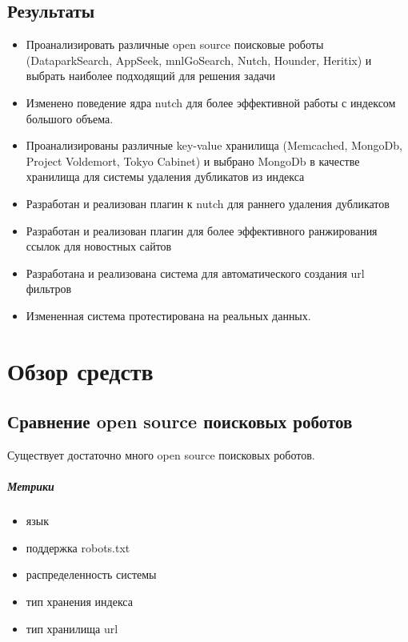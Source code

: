 \section{Результаты}
\begin{itemize}
 \item Проанализировать различные open source поисковые роботы (DataparkSearch,
AppSeek, mnlGoSearch, Nutch, Hounder, Heritix) и выбрать наиболее подходящий для
решения задачи
 \item Изменено поведение ядра nutch для более эффективной работы с индексом большого объема.
 \item Проанализированы различные key-value хранилища (Memcached, MongoDb, Project Voldemort, Tokyo Cabinet) и выбрано MongoDb в качестве хранилища для системы удаления дубликатов из индекса
 \item Разработан и реализован плагин к nutch для раннего удаления дубликатов
 \item Разработан и реализован плагин для более эффективного ранжирования ссылок для новостных сайтов
 \item Разработана и реализована система для автоматического создания url фильтров
 \item Измененная система протестирована на реальных данных.
\end{itemize}

\chapter{Обзор средств}
\section{Сравнение open source поисковых роботов}
Существует достаточно много open source поисковых роботов.
\paragraph{Метрики}
\begin{itemize}
 \item язык
 \item поддержка robots.txt
 \item распределенность системы
 \item тип хранения индекса
 \item тип хранилища url
\end{itemize}
